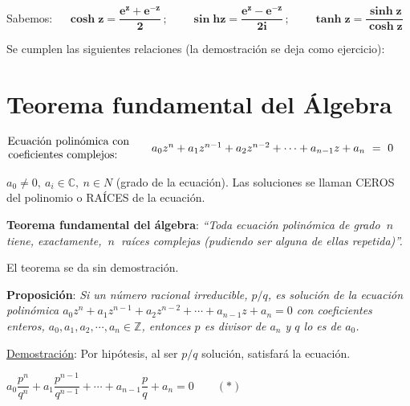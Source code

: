 Sabemos: $\quad \boldsymbol{  \cosh z= \dfrac{e^{z}+e^{-z}}{2}\, ; \qquad \sin hz= \dfrac{e^{z}-e^{-z}}{2i}\, ; \qquad \tanh z = \dfrac{\sinh z}{\cosh z}  }$


Se cumplen las siguientes relaciones (la demostración se deja como ejercicio):



 
\section{Teorema fundamental del Álgebra}
\vspace{0.5cm}

\begin{theorem}


	
$\mqty{\text{Ecuación polinómica con} \\ \text{coeficientes complejos:}\ \ \ } 
\qquad
a_0z^n+a_1z^{n-1}+a_2z^{n-2}+\cdots +a_{n-1}z+a_n\ = \ 0$

\vspace{2mm} $a_0\neq 0,\ a_i\in \mathbb C, \ n\in N $ (grado de la ecuación). Las soluciones se llaman CEROS del polinomio o RAÍCES de la ecuación.

\vspace{2mm} 	\textbf{Teorema fundamental del álgebra}: \emph{``Toda ecuación polinómica de grado $\ n \ $  tiene, exactamente, $\ n \ $ raíces complejas (pudiendo ser alguna de ellas repetida)''.}		
\end{theorem}
\textcolor{gris}{El teorema se da sin demostración.}

\vspace{4mm}
\begin{theorem}

\textbf{Proposición}:	\emph{Si un número racional irreducible, $p/q$, es solución de la ecuación polinómica $a_0z^n+a_1z^{n-1}+a_2z^{n-2}+\cdots +a_{n-1}z+a_n=0$ con coeficientes enteros, $a_0,a_1,a_2,\cdots, a_n \in \mathbb Z$, entonces $p$ es divisor de $a_n$ y $q$ lo es de $a_0$.}
\end{theorem}

\underline{Demostración}: Por hipótesis, al ser $p/q$ solución, satisfará la ecuación.

$a_0 \dfrac{p^n}{q^n}+a_1 \dfrac{p^{n-1}}{q^{n-1}}+\cdots +a_{n-1}\dfrac p q +a_n=0 \qquad (*)$

